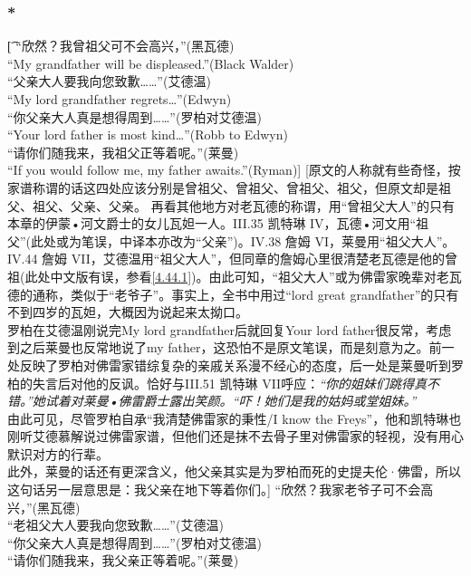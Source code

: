 \documentclass[12pt,a4paper]{article}
\begin{document}
\subsubsection{\color{red}*}\label{3.49.1}\t[
“欣然？我曾祖父可不会高兴，”(黑瓦德)\\
“My grandfather will be displeased.”(Black Walder)\\
“父亲大人要我向您致歉……”(艾德温)\\
“My lord grandfather regrets\ldots”(Edwyn)\\
“你父亲大人真是想得周到……”(罗柏对艾德温)\\
“Your lord father is most kind\ldots”(Robb to Edwyn)\\
“请你们随我来，我祖父正等着呢。”(莱曼)\\
“If you would follow me, my father awaits.”(Ryman)]
[原文的人称就有些奇怪，按家谱称谓的话这四处应该分别是曾祖父、曾祖父、曾祖父、祖父，但原文却是祖父、祖父、父亲、父亲。
再看其他地方对老瓦德的称谓，用“曾祖父大人”的只有本章的伊蒙•河文爵士的女儿瓦妲一人。III.35 凯特琳 IV，瓦德•河文用“祖父”(此处或为笔误，中译本亦改为“父亲”)。IV.38 詹姆 VI，莱曼用“祖父大人”。IV.44 詹姆 VII，艾德温用“祖父大人”，但同章的詹姆心里很清楚老瓦德是他的曾祖(此处中文版有误，参看\ref{4.44.1})。由此可知，“祖父大人”或为佛雷家晚辈对老瓦德的通称，类似于“老爷子”。事实上，全书中用过“lord great grandfather”的只有不到四岁的瓦妲，大概因为说起来太拗口。\\
罗柏在艾德温刚说完My lord grandfather后就回复Your lord father很反常，考虑到之后莱曼也反常地说了my father，这恐怕不是原文笔误，而是刻意为之。前一处反映了罗柏对佛雷家错综复杂的亲戚关系漫不经心的态度，后一处是莱曼听到罗柏的失言后对他的反讽。恰好与III.51 凯特琳 VII呼应：\emph{“你的姐妹们跳得真不错。”她试着对莱曼•佛雷爵士露出笑颜。“吓！她们是我的姑妈或堂姐妹。”}\\
由此可见，尽管罗柏自承“我清楚佛雷家的秉性/I know the Freys”，他和凯特琳也刚听艾德慕解说过佛雷家谱，但他们还是抹不去骨子里对佛雷家的轻视，没有用心默识对方的行辈。\\
此外，莱曼的话还有更深含义，他父亲其实是为罗柏而死的史提夫伦·佛雷，所以这句话另一层意思是：我父亲在地下等着你们。]
“欣然？我家老爷子可不会高兴，”(黑瓦德)\\
“老祖父大人要我向您致歉……”(艾德温)\\
“你父亲大人真是想得周到……”(罗柏对艾德温)\\
“请你们随我来，我父亲正等着呢。”(莱曼)
\end{document}
